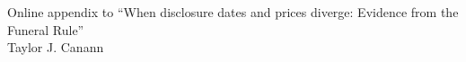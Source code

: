 \documentclass[preprint,12pt]{elsarticle}
\begin{document}
\begin{center}\large Online appendix to ``When disclosure dates and prices diverge: Evidence from the Funeral Rule''\\[4pt]\normalsize Taylor J. Canann\end{center}

\end{document}
